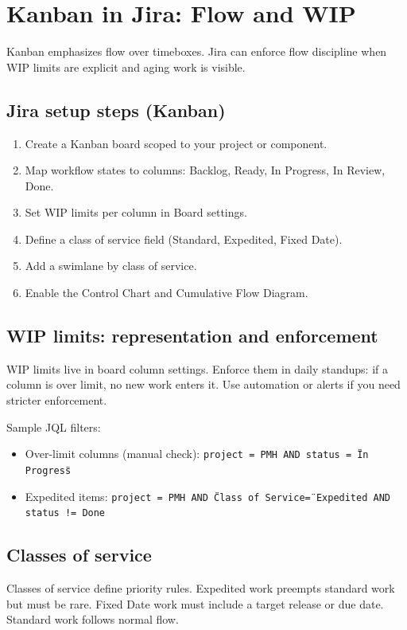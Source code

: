\section{Kanban in Jira: Flow and WIP}
Kanban emphasizes flow over timeboxes. Jira can enforce flow discipline when WIP limits are explicit and aging work is visible.

\subsection{Jira setup steps (Kanban)}
\begin{enumerate}
  \item Create a Kanban board scoped to your project or component.
  \item Map workflow states to columns: Backlog, Ready, In Progress, In Review, Done.
  \item Set WIP limits per column in Board settings.
  \item Define a class of service field (Standard, Expedited, Fixed Date).
  \item Add a swimlane by class of service.
  \item Enable the Control Chart and Cumulative Flow Diagram.
\end{enumerate}

\subsection{WIP limits: representation and enforcement}
WIP limits live in board column settings. Enforce them in daily standups: if a column is over limit, no new work enters it. Use automation or alerts if you need stricter enforcement.

Sample JQL filters:
\begin{itemize}
  \item Over-limit columns (manual check): \texttt{project = PMH AND status = \"In Progress\"}
  \item Expedited items: \texttt{project = PMH AND \"Class of Service\" = Expedited AND status != Done}
\end{itemize}

\subsection{Classes of service}
Classes of service define priority rules. Expedited work preempts standard work but must be rare. Fixed Date work must include a target release or due date. Standard work follows normal flow.

